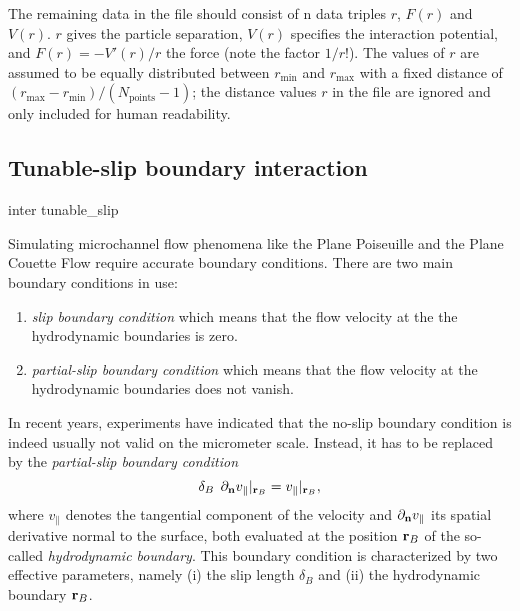 The remaining data in the file should consist of n data triples $r$, $F(r)$ and
$V(r)$. $r$ gives the particle separation, $V(r)$ specifies the interaction
potential, and $F(r)= -V'(r)/r$ the force (note the factor $1/r$!). The values
of $r$ are assumed to be equally distributed between $r_\mathrm{min}$ and
$r_\mathrm{max}$ with a fixed distance of
$(r_\mathrm{max}-r_\mathrm{min})/(N_\mathrm{points}-1)$; the distance values $r$ in
the file are ignored and only included for human readability.

\subsection{Tunable-slip boundary interaction}\label{sec:tunableSlip}
\begin{essyntax}
  inter  
  tunable_slip    
    
  \begin{features}
  \end{features}
\end{essyntax}
Simulating microchannel flow phenomena like the Plane Poiseuille and
the Plane Couette Flow require accurate boundary conditions. There are
two main boundary conditions in use:

\begin{enumerate} 
\item \emph{slip boundary condition} which means that the flow
  velocity at the the hydrodynamic boundaries is zero.
\item \emph{partial-slip boundary condition} which means that the flow 
  velocity at the hydrodynamic boundaries does not vanish.
\end{enumerate}

In recent years, experiments have indicated that the no-slip boundary
condition is indeed usually not valid on the micrometer
scale. Instead, it has to be replaced by the {\em {partial-slip
    boundary condition}}
\begin{displaymath}
\delta_B \: \: \partial_{{\bf n}} v_{\parallel}|_{{\bf r}_B} =
v_{\parallel}|_{{\bf r}_B},
\end{displaymath}
where $v_{\parallel}$ denotes the tangential component of the velocity
and $\partial_{{\bf n}} v_{\parallel}$ its spatial derivative normal
to the surface, both evaluated at the position ${\bf r}_B$ of the
so-called {\em hydrodynamic boundary}.  This boundary condition is
characterized by two effective parameters, namely (i) the slip length
$\delta_B$ and (ii) the hydrodynamic boundary ${\bf r}_B$.

